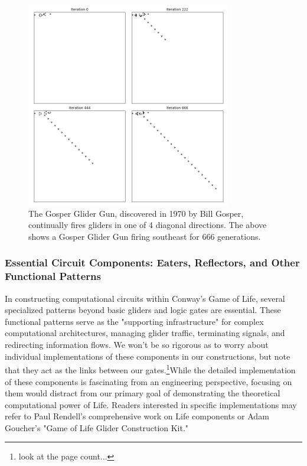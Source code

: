 \documentclass{article}
\theoremstyle{definition}
\theoremstyle{plain}
\theoremstyle{plain}
\begin{document}
\begin{figure}[H]
  \centering
  \includegraphics[width=0.8\textwidth]{figures/gosper_gun_iterations.png}
  \caption{The Gosper Glider Gun, discovered in 1970 by Bill Gosper, continually fires gliders in one of 4 diagonal directions. The above shows a Gosper Glider Gun firing southeast for 666 generations.}
  \label{fig:gosper-gun}
\end{figure}


\subsubsection{Essential Circuit Components: Eaters, Reflectors, and Other Functional Patterns}
In constructing computational circuits within Conway's Game of Life, several specialized patterns beyond basic gliders and logic gates are essential. These functional patterns serve as the "supporting infrastructure" for complex computational architectures, managing glider traffic, terminating signals, and redirecting information flows.
We won't be so rigorous as to worry about individual implementations of these components in our constructions, but note that they act as the links between our gates.\footnote{look at the page count...}While the detailed implementation of these components is fascinating from an engineering perspective, focusing on them would distract from our primary goal of demonstrating the theoretical computational power of Life. Readers interested in specific implementations may refer to Paul Rendell's comprehensive work on Life components or Adam Goucher's "Game of Life Glider Construction Kit."
\end{document}
